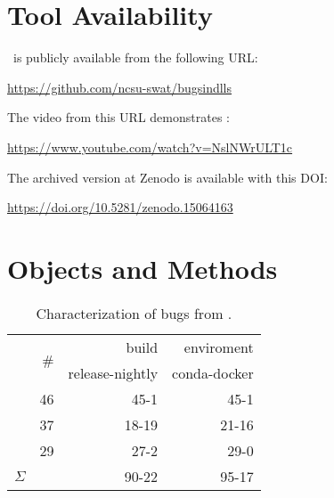 \documentclass[sigconf,screen]{acmart}
\begin{document}

\section{Tool Availability}
\label{sec:tool-availability}
\tname\ is publicly available from the following URL:

\url{https://github.com/ncsu-swat/bugsindlls}

\vspace{0.5ex}\noindent{}The video from this URL demonstrates \tname:

\url{https://www.youtube.com/watch?v=NslNWrULT1c}

\vspace{0.5ex}\noindent{}The archived version at Zenodo is available with this DOI:

\url{https://doi.org/10.5281/zenodo.15064163}\\


\section{Objects and Methods}

\begin{table}
  \centering
  \small
  \caption{\label{table:bug-characterization}Characterization of
    bugs from \tname.}
  \vspace{-1ex}
  \begin{tabular}{l|rrr}
  \toprule & \multirow{2}{*}{\#} & \multicolumn{1}{r}{build} &
  \multicolumn{1}{r}{enviroment} \\ & & release-nightly & conda-docker
  \\ \cmidrule(lr){2-4} \jax{} & 46 & 45-1 & 45-1 \\ \torch{} & 37 &
  18-19 & 21-16 \\ \tf{} & 29 & 27-2 & 29-0 \\ \midrule
  \multicolumn{1}{c|}{$\Sigma$} & \numbugs{} & 90-22& 95-17
  \\ \bottomrule
  \end{tabular}
  \vspace{-2ex}  
\end{table}
\end{document}
